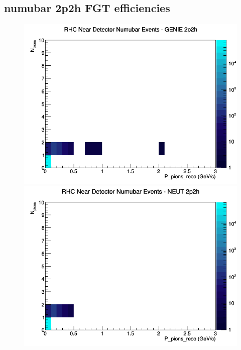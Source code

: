 \documentclass[12pt]{article}
\begin{document}
\subsection{numubar 2p2h FGT efficiencies}
\begin{figure}[h]
\includegraphics[width=\linewidth]{eff_N_P/FGT/pions/2p2h_RHC_ND_numubar_N_P_GENIE.png}
\endminipage
{}
\includegraphics[width=\linewidth]{eff_N_P/FGT/pions/2p2h_RHC_ND_numubar_N_P_NEUT.png}
\endminipage
{}

\end{figure}
\end{document}
